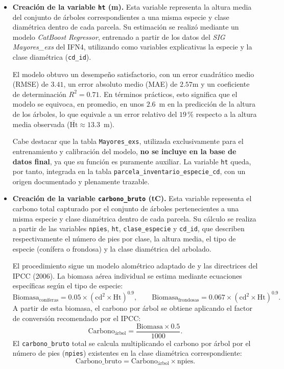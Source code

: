 \begin{itemize}
    \medskip

    \item \textbf{Creación de la variable \texttt{ht} (m).} Esta variable representa la altura media del conjunto de árboles correspondientes a una misma especie y clase diamétrica dentro de cada parcela. Su estimación se realizó mediante un modelo \textit{CatBoost Regressor}, entrenado a partir de los datos del \textit{SIG Mayores\_exs} del IFN4, utilizando como variables explicativas la especie y la clase diamétrica (\texttt{cd\_id}).  

    \medskip

    El modelo obtuvo un desempeño satisfactorio, con un error cuadrático medio (RMSE) de $3.41$, un error absoluto medio (MAE) de $2.57$m y un coeficiente de determinación $R^2 = 0.71$. En términos prácticos, esto significa que el modelo se equivoca, en promedio, en unos $2.6$~m en la predicción de la altura de los árboles, lo que equivale a un error relativo del $19\,\%$ respecto a la altura media observada ($\overline{\text{Ht}} \approx 13.3$~m).
    
    \medskip

    Cabe destacar que la tabla \texttt{Mayores\_exs}, utilizada exclusivamente para el entrenamiento y calibración del modelo, \textbf{no se incluye en la base de datos final}, ya que su función es puramente auxiliar. La variable \texttt{ht} queda, por tanto, integrada en la tabla \texttt{parcela\_inventario\_especie\_cd}, con un origen documentado y plenamente trazable.

    \medskip

    \item \textbf{Creación de la variable \texttt{carbono\_bruto} (tC).} Esta variable representa el carbono total capturado por el conjunto de árboles pertenecientes a una misma especie y clase diamétrica dentro de cada parcela. Su cálculo se realiza a partir de las variables \texttt{npies}, \texttt{ht}, \texttt{clase\_especie} y \texttt{cd\_id}, que describen respectivamente el número de pies por clase, la altura media, el tipo de especie (conífera o frondosa) y la clase diamétrica del arbolado.

    El procedimiento sigue un modelo alométrico adaptado de \cite{chave2014} y las directrices del IPCC (2006). La biomasa aérea individual se estima mediante ecuaciones específicas según el tipo de especie: 
    \[
    \text{Biomasa}_{\text{coníferas}} = 0.05 \times (\text{cd}^2 \times \text{Ht})^{0.9}, \qquad
    \text{Biomasa}_{\text{frondosas}} = 0.067 \times (\text{cd}^2 \times \text{Ht})^{0.9}.
    \]
    A partir de esta biomasa, el carbono por árbol se obtiene aplicando el factor de conversión recomendado por el IPCC:
    \[
    \text{Carbono}_{\text{árbol}} = \frac{\text{Biomasa} \times 0.5}{1000}.
    \]
    El \texttt{carbono\_bruto} total se calcula multiplicando el carbono por árbol por el número de pies (\texttt{npies}) existentes en la clase diamétrica correspondiente:
    \[
    \text{Carbono\_bruto} = \text{Carbono}_{\text{árbol}} \times \text{npies}.
    \]


\end{itemize}
